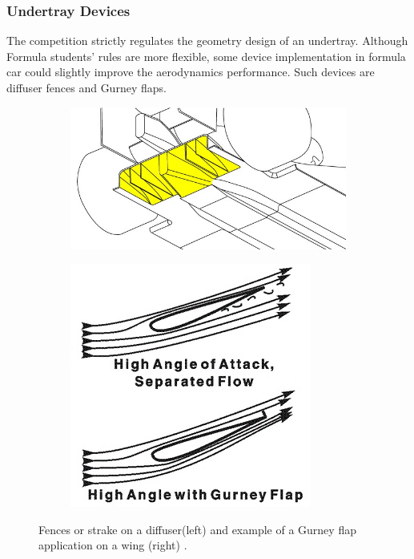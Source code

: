 \subsubsection{Undertray Devices}
The competition strictly regulates the geometry design of an undertray. Although Formula students' rules are more flexible, some device implementation in formula car could slightly improve the aerodynamics performance. Such devices are diffuser fences and Gurney flaps.

\begin{figure}[!ht]
\begin{center}
%    
  \begin{subfigure}[b]{0.4\textwidth}
    \includegraphics[scale=0.6]{Figures/diffuser_fences.jpg}
  \end{subfigure}
  \begin{subfigure}[b]{0.4\textwidth}
    \includegraphics[scale=0.8]{Figures/Gurney.jpg}
  \end{subfigure}
%  
  \caption{Fences or strake on a diffuser(left) and example of a Gurney flap application on a wing (right) \cite{Anonymous2020GurneyFlap}.}
    \label{fig:gurney}
\end{center}
\end{figure}

